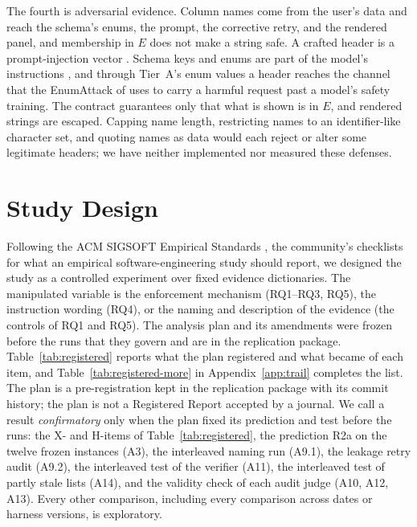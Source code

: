 \documentclass[10pt,twocolumn]{article}
\begin{document}
The fourth is adversarial evidence. Column names come from the user's data and
reach the schema's enums, the prompt, the corrective retry, and the rendered
panel, and membership in $E$ does not make a string safe. A crafted header is
a prompt-injection vector \citep{greshake2023injection}. Schema keys and enums
are part of the model's instructions \citep{le2026schemakey}, and through
Tier~A's enum values a header reaches the channel that the EnumAttack of \citet{zhang2025cda} uses to carry a harmful request past a
model's safety training. The contract guarantees only that what is shown is in
$E$, and rendered strings are escaped. Capping name length, restricting names
to an identifier-like character set, and quoting names as data would each
reject or alter some legitimate headers; we have neither implemented nor
measured these defenses.

\section{Study Design}\label{sec:design}

Following the ACM SIGSOFT Empirical Standards \citep{ralph2020standards}, the
community's checklists for what an empirical software-engineering study should
report, we designed the study as a controlled experiment over fixed evidence
dictionaries. The manipulated variable is the enforcement mechanism (RQ1--RQ3,
RQ5), the instruction wording (RQ4), or the naming and description of the
evidence (the controls of RQ1 and RQ5). The analysis plan and its amendments
were frozen before the runs that they govern and are in the replication
package. Table~\ref{tab:registered} reports what the plan registered and what
became of each item, and Table~\ref{tab:registered-more} in
Appendix~\ref{app:trail} completes the list. The plan is a pre-registration kept in the replication
package with its commit history; the plan is not a Registered Report accepted
by a journal. We call a result \emph{confirmatory} only when the plan fixed its
prediction and test before the runs: the X- and H-items of
Table~\ref{tab:registered}, the prediction
R2a on the twelve frozen instances (A3), the interleaved naming run (A9.1), the
leakage retry audit (A9.2), the interleaved test of the verifier (A11), the interleaved
test of partly stale lists (A14), and the validity check of each audit judge
(A10, A12, A13). Every other comparison,
including every comparison across dates or harness versions, is exploratory.
\end{document}
